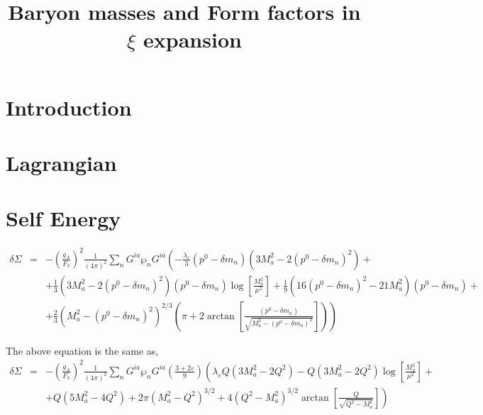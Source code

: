 \documentclass[10pt,a4paper]{article}
\title{Baryon masses and Form factors in $\xi$ expansion}
\date{}
\begin{document}
\maketitle

\section{Introduction}

\section{Lagrangian}

\section{Self Energy}

\begin{eqnarray}
\delta \Sigma &=& - \left(\frac{g_A}{F_\pi}\right)^2 \frac{1}{(4\pi)^2}\sum_{n}^{}G^{ia}\wp_n G^{ia} \left( -\frac{\lambda_\varepsilon}{3} (p^0-\delta m_n) (3 M_a^2 - 2(p^0-\delta m_n)^2) + \right.  \nonumber \\
& & \left. + \frac{1}{3} (3 M_a^2 - 2(p^0-\delta m_n)^2)(p^0-\delta m_n)  \log\left[\frac{M_a^2}{\mu^2}\right] + \frac{1}{9} \left(16 (p^0-\delta m_n)^2 -21 M_a^2 \right)(p^0-\delta m_n) + \right. \nonumber \\
& & \left. + \frac{2}{3} (M_a^2 - (p^0-\delta m_n)^2)^{2/3} \left(\pi + 2 \arctan \left[ \frac{(p^0-\delta m_n)}{\sqrt{M_a^2-(p^0-\delta m_n)^2}}\right]\right) \right)
\end{eqnarray}

The above equation is the same as,
\begin{eqnarray}
\delta \Sigma &=&  - \left(\frac{g_A}{F_\pi}\right)^2 \frac{1}{(4\pi)^2}\sum_{n}^{}G^{ia}\wp_n G^{ia}\left( \frac{3+ 2\varepsilon}{9}\right) \left( \lambda_{\varepsilon} Q (3M_a^2 -2 Q^2)- Q(3M_a^2 - 2Q^2)\log\left[\frac{M_a^2}{\mu^2}\right]+ \right. \nonumber \\
& & \left. + Q(5M_a^2 - 4 Q^2) + 2\pi(M_a^2-Q^2)^{3/2} + 4(Q^2-M_a^2)^{3/2}\arctan\left[\frac{Q}{\sqrt{Q^2-M_a^2}}\right] \right) 
\end{eqnarray}
\end{document}
